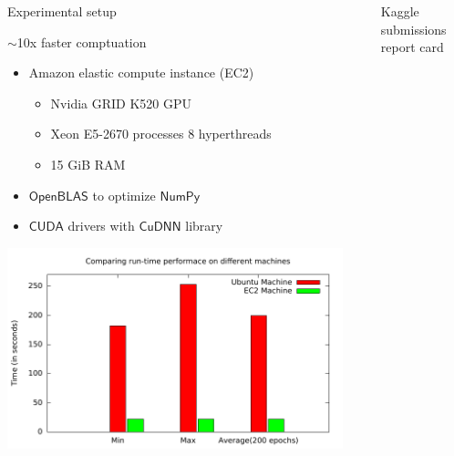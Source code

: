 \documentclass[20pt]{beamer}
\newlength{\sepwid}
\newlength{\onecolwid}
\newlength{\twocolwid}
\begin{document}
\begin{frame}[t]
\begin{columns}[t]
\begin{column}{\onecolwid}
\begin{block}{Experimental setup}
\begin{minipage}{0.4\onecolwid}
$\sim$10x faster comptuation 
\begin{itemize}
\item Amazon elastic compute instance (EC2)
\begin{itemize}
\item Nvidia GRID K520 GPU
\item Xeon E5-2670 processes 8 hyperthreads
\item 15 GiB RAM
\end{itemize}
\item $\mathsf{OpenBLAS}$ to optimize $\mathsf{NumPy}$
\item $\mathsf{CUDA}$ drivers with $\mathsf{CuDNN}$ library
\end{itemize}
\end{minipage}
\begin{minipage}{0.6\onecolwid}
\centering
\includegraphics[scale=1.2]{Submissionlogs/RunTime.pdf}
\end{minipage}
\end{block}


\end{column} %


\begin{column}{\sepwid}\end{column} %
\begin{column}{\twocolwid} %


\begin{alertblock}{Kaggle submissions report card}
\vspace*{0.3in}


\end{alertblock}
\end{column}
\end{columns}
\end{frame}
\end{document}
